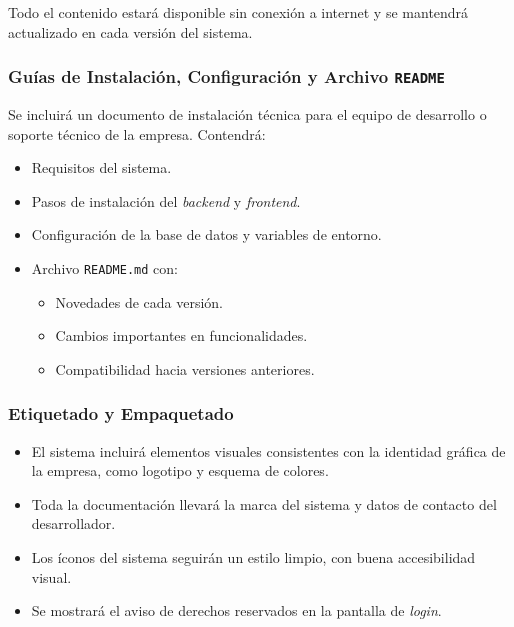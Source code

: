 Todo el contenido estará disponible sin conexión a internet y se mantendrá actualizado en cada versión del sistema.

\subsubsection*{Guías de Instalación, Configuración y Archivo \texttt{README}}

Se incluirá un documento de instalación técnica para el equipo de desarrollo o soporte técnico de la empresa. Contendrá:

\begin{itemize}
	\item Requisitos del sistema.
	\item Pasos de instalación del \textit{backend} y \textit{frontend}.
	\item Configuración de la base de datos y variables de entorno.
	\item Archivo \texttt{README.md} con:
	      \begin{itemize}
		      \item Novedades de cada versión.
		      \item Cambios importantes en funcionalidades.
		      \item Compatibilidad hacia versiones anteriores.
	      \end{itemize}
\end{itemize}

\subsubsection*{Etiquetado y Empaquetado}

\begin{itemize}
	\item El sistema incluirá elementos visuales consistentes con la identidad gráfica de la empresa, como logotipo y esquema de colores.
	\item Toda la documentación llevará la marca del sistema y datos de contacto del desarrollador.
	\item Los íconos del sistema seguirán un estilo limpio, con buena accesibilidad visual.
	\item Se mostrará el aviso de derechos reservados en la pantalla de \textit{login}.
\end{itemize}







